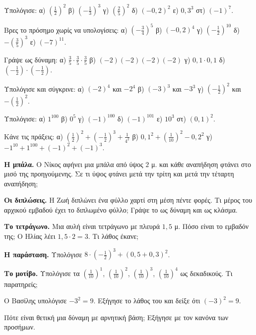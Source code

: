 \ex Υπολόγισε: α) $\left(\frac{1}{2}\right)^2$ \quad β) $\left(-\frac{1}{3}\right)^3$ \quad γ) $\left(\frac{2}{5}\right)^2$ \quad δ) $(-0{,}2)^2$ \quad ε) $0{,}3^3$ \quad στ) $(-1)^7$.

\ex Βρες το πρόσημο χωρίς να υπολογίσεις: α) $\left(-\frac{3}{4}\right)^5$ \quad β) $(-0{,}2)^4$ \quad γ) $\left(-\frac{1}{2}\right)^{10}$ \quad δ) $-\left(\frac{3}{5}\right)^3$ \quad ε) $(-7)^{11}$.

\ex Γράψε ως δύναμη: α) $\frac{3}{5}\cdot\frac{3}{5}\cdot\frac{3}{5}$ \quad β) $(-2)(-2)(-2)(-2)$ \quad γ) $0{,}1\cdot0{,}1$ \quad δ) $\left(-\frac{1}{2}\right)\cdot\left(-\frac{1}{2}\right)$.

\ex Υπολόγισε και σύγκρινε: α) $(-2)^4$ και $-2^4$ \quad β) $(-3)^3$ και $-3^3$ \quad γ) $\left(-\frac{1}{2}\right)^2$ και $-\left(\frac{1}{2}\right)^2$.

\ex Υπολόγισε: α) $1^{100}$ \quad β) $0^5$ \quad γ) $(-1)^{100}$ \quad δ) $(-1)^{101}$ \quad ε) $10^3$ \quad στ) $(0{,}1)^2$.

\ex Κάνε τις πράξεις: α) $\left(\frac{1}{2}\right)^2+\left(-\frac{1}{2}\right)^3+\frac{1}{4^2}$ \quad β) $0{,}1^2+\left(\frac{1}{10}\right)^2-0{,}2^2$ \quad γ) $-1^{10}+1^{100}+(-1)^2+(-1)^3$.


\ex \textbf{Η μπάλα.} Ο Νίκος αφήνει μια μπάλα από ύψος $2$ μ. και κάθε αναπήδηση φτάνει στο μισό της προηγούμενης. Σε τι ύψος φτάνει μετά την τρίτη και μετά την τέταρτη αναπήδηση;

\ex \textbf{Οι διπλώσεις.} Η Ζωή διπλώνει ένα φύλλο χαρτί στη μέση πέντε φορές. Τι μέρος του αρχικού εμβαδού έχει το διπλωμένο φύλλο; Γράψε το ως δύναμη και ως κλάσμα.

\ex \textbf{Το τετράγωνο.} Μια αυλή είναι τετράγωνο με πλευρά $1{,}5$ μ. Πόσο είναι το εμβαδόν της; Ο Ηλίας λέει $1{,}5\cdot2=3$. Τι λάθος έκανε;

\ex \textbf{Η παράσταση.} Υπολόγισε $8\cdot\left(-\frac{1}{2}\right)^3+(0{,}5+0{,}3)^2$.

\ex \textbf{Το μοτίβο.} Υπολόγισε τα $\left(\frac{1}{10}\right)^1$, $\left(\frac{1}{10}\right)^2$, $\left(\frac{1}{10}\right)^3$, $\left(\frac{1}{10}\right)^4$ ως δεκαδικούς. Τι παρατηρείς;


\ex Ο Βασίλης υπολόγισε $-3^2=9$. Εξήγησε το λάθος του και δείξε ότι $(-3)^2=9$.

\ex Πότε είναι θετική μια δύναμη με αρνητική βάση; Εξήγησε με τον κανόνα των προσήμων.

